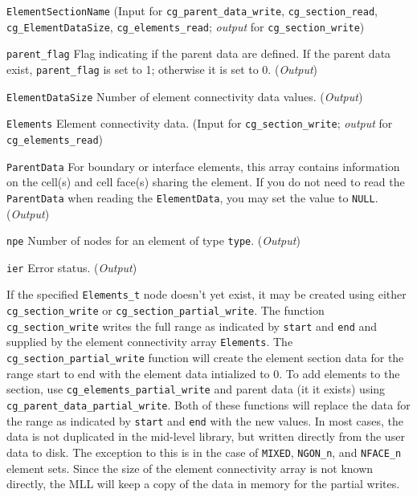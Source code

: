 \begin{Ventryi}{\texttt{ElementSectionName}}
      (\textcolor{input}{Input} for \texttt{cg\_parent\_data\_write},
      \texttt{cg\_section\_read}, \texttt{cg\_ElementDataSize},
      \texttt{cg\_elements\_read};
      \textcolor{output}{\textit{output}} for \texttt{cg\_section\_write})
\item [\texttt{parent\_flag}]
      Flag indicating if the parent data are defined.
      If the parent data exist, \texttt{parent\_flag} is set to 1;
      otherwise it is set to 0.
      (\textcolor{output}{\textit{Output}})
\item [\texttt{ElementDataSize}]
      Number of element connectivity data values.
      (\textcolor{output}{\textit{Output}})
\item [\texttt{Elements}]
      Element connectivity data.
      (\textcolor{input}{Input} for \texttt{cg\_section\_write};
      \textcolor{output}{\textit{output}} for \texttt{cg\_elements\_read})
\item [\texttt{ParentData}]
      For boundary or interface elements, this array contains
      information on the cell(s) and cell face(s) sharing the element.
      If you do not need to read the \texttt{ParentData} when reading
      the \texttt{ElementData}, you may set the value to \texttt{NULL}.
      (\textcolor{output}{\textit{Output}})
\item [\texttt{npe}]
      Number of nodes for an element of type \texttt{type}.
      (\textcolor{output}{\textit{Output}})
\item [\texttt{ier}]
      Error status.
      (\textcolor{output}{\textit{Output}})
\end{Ventryi}

If the specified \texttt{Elements\_t} node doesn't yet exist,
it may be created using either \texttt{cg\_sec\-tion\_write} or
\texttt{cg\_section\_partial\_write}.
The function \texttt{cg\_section\_write} writes the full range as
indicated by \texttt{start} and \texttt{end}
and supplied by the element connectivity array \texttt{Elements}. The 
\texttt{cg\_section\_partial\_write} function will create the element 
section data for the range start to end with the element data intialized 
to $0$. To add elements to the section, use \texttt{cg\_elements\_partial\_write} 
and parent data (it it exists) using \texttt{cg\_parent\_data\_partial\_write}. 
Both of these functions will replace the data for the range as indicated by 
\texttt{start} and \texttt{end} with the new values. In most cases, the data is 
not duplicated in the mid-level library, but written directly from the user data 
to disk. The exception to this is in the case of \texttt{MIXED}, 
\texttt{NGON\_n}, and \texttt{NFACE\_n} element sets. Since the size of the 
element connectivity array is not known directly, the MLL will keep a copy 
of the data in memory for the partial writes.

